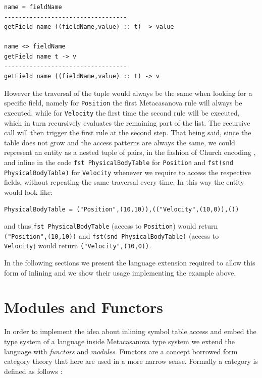 \begin{lstlisting}
name = fieldName
----------------------------------
getField name ((fieldName,value) :: t) -> value

name <> fieldName
getField name t -> v
----------------------------------
getField name ((fieldName,value) :: t) -> v
\end{lstlisting}

\noindent
However the traversal of the tuple would always be the same when looking for a specific field, namely for \texttt{Position} the first Metacasanova rule will always be executed, while for \texttt{Velocity} the first time the second rule will be executed, which in turn recursively evaluates the remaining part of the list. The recursive call will then trigger the first rule at the second step. That being said, since the table does not grow and the access patterns are always the same, we could represent an entity as a nested tuple of pairs, in the fashion of Church encoding \cite{pierce2002types, kleene1935theory}, and inline in the code \texttt{fst PhysicalBodyTable} for \texttt{Position} and \texttt{fst(snd PhysicalBodyTable)} for \texttt{Velocity} whenever we require to access the respective fields, without repeating the same traversal every time. In this way the entity would look like:

\begin{lstlisting}
PhysicalBodyTable = ("Position",(10,10)),(("Velocity",(10,0)),())
\end{lstlisting}

\noindent
and thus \texttt{fst PhysicalBodyTable} (access to \texttt{Position}) would return\\ \texttt{("Position",(10,10))} and \texttt{fst(snd PhysicalBodyTable)} (access to\\ \texttt{Velocity}) would return \texttt{("Velocity",(10,0))}.

In the following sections we present the language extension required to allow this form of inlining and we show their usage implementing the example above.

\section{Modules and Functors}
\label{sec:ch_functors_modules_functors}
In order to implement the idea about inlining symbol table access and embed the type system of a language inside Metacasanova type system we extend the language with \textit{functors} and \textit{modules}. Functors are a concept borrowed form category theory that here are used in a more narrow sense. Formally a category is defined as follows \cite{asperti1991categories, mitchell1965theory, pierce1991basic}:

